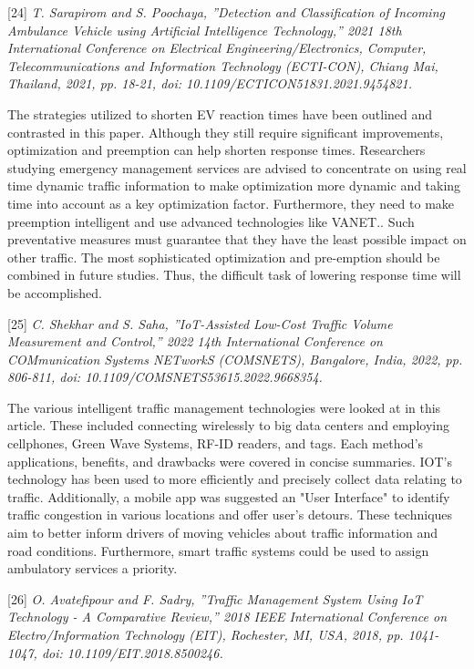 \documentclass[conference]{IEEEtran}
\begin{document}
[24]\emph{ T. Sarapirom and S. Poochaya, ”Detection and Classification of Incoming Ambulance Vehicle using Artificial
Intelligence Technology,” 2021 18th International Conference
on Electrical Engineering/Electronics, Computer, Telecommunications and Information Technology (ECTI-CON), Chiang Mai, Thailand, 2021, pp. 18-21, doi: 10.1109/ECTICON51831.2021.9454821. }

The strategies utilized to shorten EV reaction times have been outlined and contrasted in this paper. Although they still require significant improvements, optimization and preemption can help shorten response times. Researchers studying emergency management services are advised to concentrate on using real time dynamic traffic information to make optimization more dynamic and taking time into account as a key optimization factor. Furthermore, they need to make preemption intelligent and use advanced technologies like VANET.. Such preventative measures must guarantee that they have the least possible impact on other traffic. The most sophisticated optimization and pre-emption should be combined in future studies. Thus, the difficult task of lowering response time will be accomplished.

[25]\emph{ C. Shekhar and S. Saha, ”IoT-Assisted Low-Cost
Traffic Volume Measurement and Control,” 2022 14th International Conference on COMmunication Systems NETworkS
(COMSNETS), Bangalore, India, 2022, pp. 806-811, doi:
10.1109/COMSNETS53615.2022.9668354. }

The various intelligent traffic management technologies were looked at in this article. These included connecting wirelessly to big data centers and employing cellphones, Green Wave Systems, RF-ID readers, and tags. Each method's applications, benefits, and drawbacks were covered in concise summaries. IOT's technology has been used to more efficiently and precisely collect data relating to traffic. Additionally, a mobile app was suggested an  "User Interface" to identify traffic congestion in various locations and offer user's detours. These techniques aim to better inform drivers of moving vehicles about traffic information and road conditions. Furthermore, smart traffic systems could be used to assign ambulatory services a priority.

[26]\emph{ O. Avatefipour and F. Sadry, ”Traffic Management
System Using IoT Technology - A Comparative Review,”
2018 IEEE International Conference on Electro/Information
Technology (EIT), Rochester, MI, USA, 2018, pp. 1041-1047,
doi: 10.1109/EIT.2018.8500246. }
\end{document}
